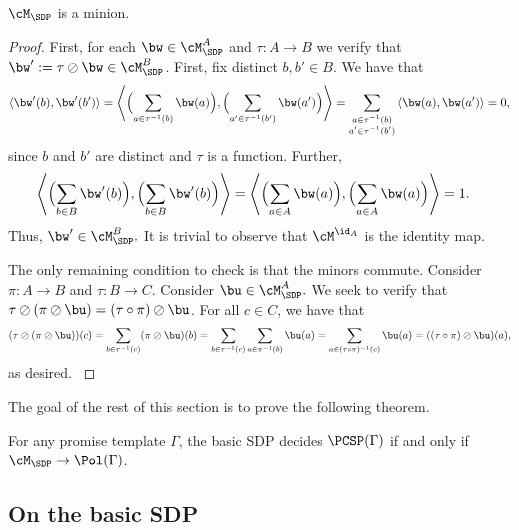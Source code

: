 {\begin{lemma}
$\cM_{\SDP}$ is a minion.
\end{lemma}}
\begin{proof}
First, for each {$\bw \in \cM_{\SDP}^{A}$} and {$\tau : A \to B$} we verify that ${\bw' := \tau \oslash \bw \in \cM_{\SDP}^{B}}$. First, fix {distinct $b, b' \in B$}. We have that
\begin{equation*}
    { \langle \bw'(b) , \bw'(b') \rangle }= { \left\langle \Bigl(\sum_{a \in \tau^{-1}(b)} \bw(a)\Bigr), \Bigl(\sum_{a' \in \tau^{-1}(b')} \bw(a')\Bigr)\right\rangle}
    = \sum_{{\substack{a \in \tau^{-1}(b)\\a' \in \tau^{-1}(b')}}} { \langle \bw(a) , \bw(a')\rangle}
    = 0{,}
\end{equation*}
{since $b$ and $b'$ are distinct and $\tau$ is a function.} Further,
\begin{align*}
{ \left\langle \Bigl( \sum_{b \in B} \bw'(b)\Bigr), \Bigl(\sum_{b \in B} \bw'(b)\Bigr) \right\rangle} &= { \left\langle \Bigl(\sum_{a\in A} \bw(a)\Bigr), \Bigl(\sum_{a\in A} \bw(a)\Bigr) \right\rangle}= 1.
\end{align*}
Thus, ${\bw' \in \cM_{\SDP}^{B}}.$ It is trivial to observe that {$\cM^{\id_A}$ is the identity map.}

The only remaining condition to check is that the minors commute. Consider {$\pi : A \to B$} and {$\tau : B \to C$. Consider $\bu \in \cM_{\SDP}^A.$}  We seek to verify that $\tau \oslash (\pi \oslash \bu) = (\tau \circ \pi) \oslash \bu$. For all {$c \in C$}, we have that
{
\begin{align*}
(\tau \oslash (\pi \oslash \bu))(c) = \sum_{b \in \tau^{-1}(c)} (\pi \oslash \bu)(b) = \sum_{b \in \tau^{-1}(c)} \sum_{a \in \pi^{-1}(b)} \bu(a) = \sum_{a \in (\tau \circ \pi)^{-1}(c)} \bu(a) = ((\tau \circ \pi) \oslash \bu)(a),
\end{align*}
as desired.
}
\end{proof}

The goal of the rest of this section is to prove the following theorem.

\begin{theorem}\label{thm:basic-SDP}
{For any promise template $\Gamma$, t}he basic SDP decides $\PCSP({\Gamma})$ if and only if $\cM_{\SDP} \to \Pol({\Gamma})${.}
\end{theorem}

\subsection{On the basic SDP}

